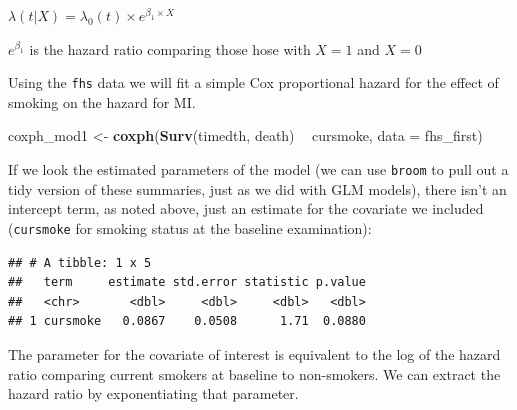 \documentclass[
]{book}
\newenvironment{Shaded}{\begin{snugshade}}{\end{snugshade}}
\newcommand{\DataTypeTok}[1]{\textcolor[rgb]{0.13,0.29,0.53}{#1}}
\newcommand{\FloatTok}[1]{\textcolor[rgb]{0.00,0.00,0.81}{#1}}
\newcommand{\KeywordTok}[1]{\textcolor[rgb]{0.13,0.29,0.53}{\textbf{#1}}}
\newcommand{\NormalTok}[1]{#1}
\newcommand{\OperatorTok}[1]{\textcolor[rgb]{0.81,0.36,0.00}{\textbf{#1}}}
\newcommand{\StringTok}[1]{\textcolor[rgb]{0.31,0.60,0.02}{#1}}
\begin{document}
\(\lambda(t|X)=\lambda_{0}(t)\times e^{\beta_{1}\times X}\)

\(e^{\beta_{1}}\) is the hazard ratio comparing those hose with \(X=1\) and \(X=0\)

Using the \texttt{fhs} data we will fit a simple Cox proportional hazard for the effect of smoking on the hazard for MI.

\begin{Shaded}
\begin{Highlighting}[]
\NormalTok{coxph_mod1 <-}\StringTok{ }\KeywordTok{coxph}\NormalTok{(}\KeywordTok{Surv}\NormalTok{(timedth, death) }\OperatorTok{~}\StringTok{ }\NormalTok{cursmoke, }\DataTypeTok{data =}\NormalTok{ fhs_first)}
\end{Highlighting}
\end{Shaded}

If we look the estimated parameters of the model (we can use \texttt{broom} to pull out a tidy version of these summaries, just as we did with GLM models), there isn't an intercept term, as noted above, just an estimate for the covariate we included (\texttt{cursmoke} for smoking status at the baseline examination):

\begin{Shaded}
\end{Shaded}

\begin{verbatim}
## # A tibble: 1 x 5
##   term     estimate std.error statistic p.value
##   <chr>       <dbl>     <dbl>     <dbl>   <dbl>
## 1 cursmoke   0.0867    0.0508      1.71  0.0880
\end{verbatim}

The parameter for the covariate of interest is equivalent to the log of the hazard ratio comparing current smokers at baseline to non-smokers. We can extract the hazard ratio by exponentiating that parameter.

\begin{Shaded}
\end{Shaded}
\end{document}
